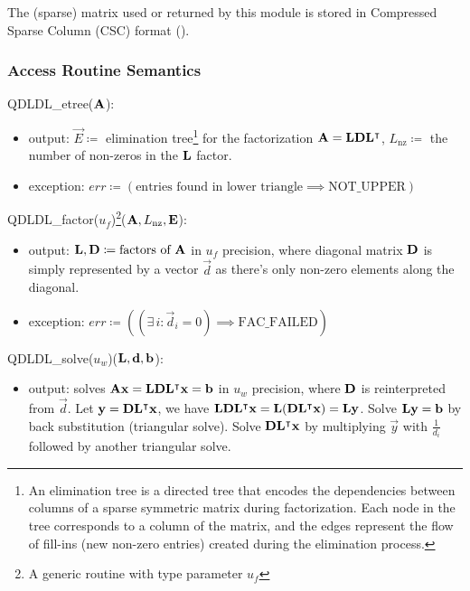 \documentclass[12pt, titlepage]{article}
\begin{document}
The (sparse) matrix used or returned by this module is stored in Compressed
Sparse Column (CSC) format (\cite{noauthor_compressed_nodate}).

\subsubsection{Access Routine Semantics}

\noindent QDLDL\_etree(\(\mathbf{A}\)):
\begin{itemize}
\item output: \(\vec{E} \coloneq\) elimination tree\footnote{An elimination tree is a directed
    tree that encodes the dependencies between columns of a sparse symmetric
    matrix during factorization. Each node in the tree corresponds to a column
    of the matrix, and the edges represent the flow of fill-ins (new non-zero
    entries) created during the elimination process.} for the factorization
  \(\mathbf{A} = \mathbf{L}\mathbf{D}\mathbf{L}^\intercal{}\), \(L_\mathrm{nz}
  \coloneq\) the number of non-zeros in the \(\mathbf{L}\) factor.
\item exception: \(err \coloneq (\text{entries found in lower triangle} \implies
  \text{NOT\_UPPER})\)
\end{itemize}

\noindent QDLDL\_factor(\(u_f\))\footnote{A generic routine with type parameter
  \(u_f\)}(\(\mathbf{A}, L_\mathrm{nz}, \mathbf{E}\)):
\begin{itemize}
\item output: \(\mathbf{L}, \mathbf{D} \coloneq \text{factors of } \mathbf{A}\) in \(u_f\)
  precision, where diagonal matrix \(\mathbf{D}\) is simply represented by a
  vector \(\vec{d}\) as there's only non-zero elements along the diagonal.
\item exception: \(err \coloneq ((\exists\,i: \vec{d}_i = 0) \implies \text{FAC\_FAILED})\)
\end{itemize}

\noindent QDLDL\_solve(\(u_w\))(\(\mathbf{L}, \mathbf{d}, \mathbf{b}\)):
\begin{itemize}
\item output: solves \(\mathbf{A}\mathbf{x} = \mathbf{L}\mathbf{D}\mathbf{L}^\intercal{} \mathbf{x} = \mathbf{b}
  \) in \(u_w\) precision, where \(\mathbf{D}\) is reinterpreted from \(\vec{d}\).
  Let \(\mathbf{y} = \mathbf{D}\mathbf{L}^\intercal{} \mathbf{x}\), we have
  \(\mathbf{L}\mathbf{D}\mathbf{L}^\intercal{} \mathbf{x} = \mathbf{L}
  (\mathbf{D}\mathbf{L}^\intercal{} \mathbf{x}) = \mathbf{L}\mathbf{y}\). Solve
  \(\mathbf{L}\mathbf{y} = \mathbf{b}\) by back substitution (triangular solve). Solve
  \(\mathbf{D}\mathbf{L}^\intercal{} \mathbf{x}\) by multiplying \(\vec{y}\) with
  \(\frac{1}{d_i}\) followed by another triangular solve.
\end{itemize}
\end{document}
